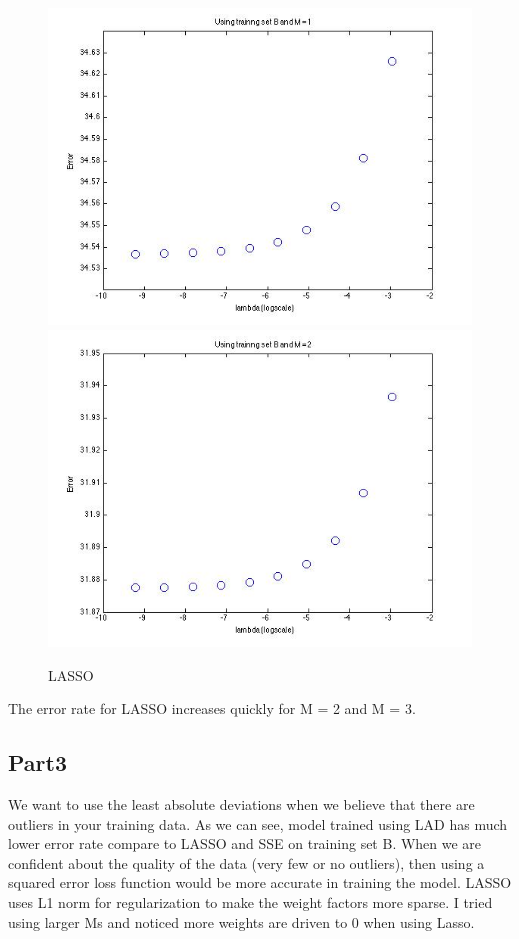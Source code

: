 \begin{figure}[!htb]
\endminipage\hfill
{}                                                                                 \includegraphics[width=\linewidth]{figures/p4_LASSO_regressB_m=1}
\endminipage\hfill
{}
  \includegraphics[width=\linewidth]{figures/p4_LASSO_regressB_m=2}
\endminipage\hfill
\caption{LASSO}
\end{figure}


The error rate for LASSO increases quickly for M = 2 and M = 3.


\subsection{Part3}
We want to use the least absolute deviations
when we believe that there are outliers in your training data. As we can see, model trained using LAD
has much lower error rate compare to LASSO and SSE on training set B. When we are confident about the quality of the data (very few or no outliers), then using a squared error loss function would be more accurate in training the model. LASSO uses L1 norm for regularization to make the weight factors more sparse. 
I tried using larger Ms and noticed more weights are driven to 0 when using Lasso. 

